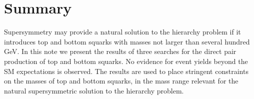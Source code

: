 \section{Summary}
\label{sec:summary}

Supersymmetry may provide a natural solution to the hierarchy problem if it introduces top and bottom squarks with masses not
larger than several hundred GeV. In this note we present the results of three searches for the direct pair production of top 
and bottom squarks. No evidence for event yields beyond the SM expectations is observed. The results are used to place 
stringent constraints on the masses of top and bottom squarks, in the mass range relevant for the natural supersymmetric 
solution to the hierarchy problem.
